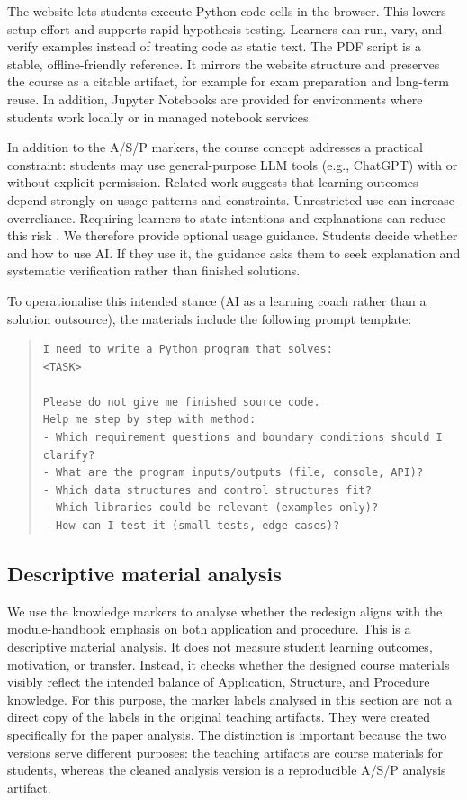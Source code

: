 \documentclass{article}
\begin{document}
The website lets students execute Python code cells in the browser. This lowers setup effort and supports rapid hypothesis testing. Learners can run, vary, and verify examples instead of treating code as static text. The PDF script is a stable, offline-friendly reference. It mirrors the website structure and preserves the course as a citable artifact, for example for exam preparation and long-term reuse. In addition, Jupyter Notebooks are provided for environments where students work locally or in managed notebook services.\par




In addition to the A/S/P markers, the course concept addresses a practical constraint: students may use general-purpose LLM tools (e.g., ChatGPT) with or without explicit permission. Related work suggests that learning outcomes depend strongly on usage patterns and constraints. Unrestricted use can increase overreliance. Requiring learners to state intentions and explanations can reduce this risk \citep{Sankaranarayanan2026EpistemicDebt}. We therefore provide optional usage guidance. Students decide whether and how to use AI. If they use it, the guidance asks them to seek explanation and systematic verification rather than finished solutions.\par
To operationalise this intended stance (AI as a learning coach rather than a solution outsource), the materials include the following prompt template:
\begin{quote}
\small
\begin{verbatim}
I need to write a Python program that solves:
<TASK>

Please do not give me finished source code.
Help me step by step with method:
- Which requirement questions and boundary conditions should I clarify?
- What are the program inputs/outputs (file, console, API)?
- Which data structures and control structures fit?
- Which libraries could be relevant (examples only)?
- How can I test it (small tests, edge cases)?
\end{verbatim}
\end{quote}



\subsection{Descriptive material analysis}
\label{sec:evaluation}
We use the knowledge markers to analyse whether the redesign aligns with the module-handbook emphasis on both application and procedure. This is a descriptive material analysis. It does not measure student learning outcomes, motivation, or transfer. Instead, it checks whether the designed course materials visibly reflect the intended balance of Application, Structure, and Procedure knowledge. For this purpose, the marker labels analysed in this section are not a direct copy of the labels in the original teaching artifacts. They were created specifically for the paper analysis. The distinction is important because the two versions serve different purposes: the teaching artifacts are course materials for students, whereas the cleaned analysis version is a reproducible A/S/P analysis artifact.\par
\end{document}
